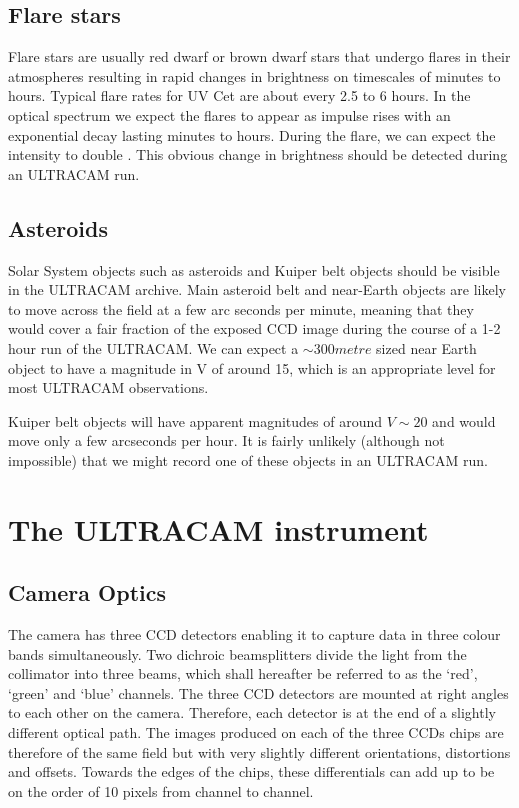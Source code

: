 \subsection{Flare stars}
Flare stars are usually red dwarf or brown dwarf stars that undergo flares in their atmospheres resulting in rapid changes in brightness on timescales of minutes to hours. Typical flare rates for {UV Cet} are about every 2.5 to 6 hours. In the optical spectrum we expect the flares to appear as impulse rises with an exponential decay lasting minutes to hours. During the flare, we can expect the intensity to double \cite{stellaractivity}. This obvious change in brightness should be detected during an ULTRACAM run. 

\subsection{Asteroids}
Solar System objects such as asteroids and Kuiper belt objects should be visible in the ULTRACAM archive. Main asteroid belt and near-Earth objects are likely to move across the field at a few arc seconds per minute, meaning that they would cover a fair fraction of the exposed CCD image during the course of a 1-2 hour run of the ULTRACAM. We can expect a $\sim 300 metre$ sized near Earth object to have a magnitude in V of around 15, \cite{neosmalltelescope} which is an appropriate level for most ULTRACAM observations. 

Kuiper belt objects will have apparent magnitudes of around $V\sim 20$ and would move only a few arcseconds per hour. It is fairly unlikely (although not impossible) that we might record one of these objects in an ULTRACAM run. 

\section{The ULTRACAM instrument} 

\subsection{Camera Optics}

The camera has three CCD detectors enabling it to capture data in three colour bands simultaneously. Two dichroic beamsplitters divide the light from the collimator into three beams, which shall hereafter be referred to as the `red', `green' and `blue' channels. The three CCD detectors are mounted at right angles to each other on the camera. Therefore, each detector is at the end of a slightly different optical path. The images produced on each of the three CCDs chips are therefore of the same field but with very slightly different orientations, distortions and offsets. Towards the edges of the chips, these differentials can add up to be on the order of 10 pixels from channel to channel. 

